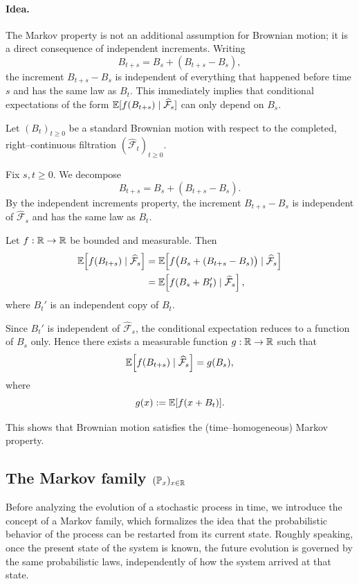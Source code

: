 \paragraph{Idea.}
The Markov property is not an additional assumption for Brownian motion;
it is a direct consequence of independent increments.
Writing
\[
B_{t+s}=B_s+(B_{t+s}-B_s),
\]
the increment $B_{t+s}-B_s$ is independent of everything that happened before time $s$ and has the same
law as $B_t$.
This immediately implies that conditional expectations of the form
$\mathbb{E}[f(B_{t+s})\mid\widehat{\mathcal F}_s]$ can only depend on $B_s$.

\medskip

Let $(B_t)_{t\ge0}$ be a standard Brownian motion with respect to the completed,
right--continuous filtration $(\widehat{\mathcal F}_t)_{t\ge0}$.

Fix $s,t\ge0$. We decompose
\[
B_{t+s} = B_s + (B_{t+s}-B_s).
\]
By the independent increments property, the increment $B_{t+s}-B_s$ is independent of
$\widehat{\mathcal F}_s$ and has the same law as $B_t$.

Let $f:\mathbb{R}\to\mathbb{R}$ be bounded and measurable. Then
\begin{align*}
\mathbb{E}\!\left[f(B_{t+s}) \mid \widehat{\mathcal F}_s\right]
&= \mathbb{E}\!\left[f\bigl(B_s + (B_{t+s}-B_s)\bigr) \mid \widehat{\mathcal F}_s\right] \\
&= \mathbb{E}\!\left[f(B_s + B_t') \mid \widehat{\mathcal F}_s\right],
\end{align*}
where $B_t'$ is an independent copy of $B_t$.

Since $B_t'$ is independent of $\widehat{\mathcal F}_s$, the conditional expectation reduces to a
function of $B_s$ only. Hence there exists a measurable function $g:\mathbb{R}\to\mathbb{R}$ such that
\[
\mathbb{E}\!\left[f(B_{t+s}) \mid \widehat{\mathcal F}_s\right] = g(B_s),
\]
where
\[
g(x) := \mathbb{E}[f(x+B_t)].
\]

This shows that Brownian motion satisfies the (time--homogeneous) Markov property.

\subsection{The Markov family \texorpdfstring{$(\mathbb P_x)_{x\in\mathbb{R}}$}{}}
Before analyzing the evolution of a stochastic process in time, we introduce the concept of a Markov family, which formalizes the idea that the probabilistic behavior of the process can be restarted from its current state. Roughly speaking, once the present state of the system is known, the future evolution is governed by the same probabilistic laws, independently of how the system arrived at that state.

